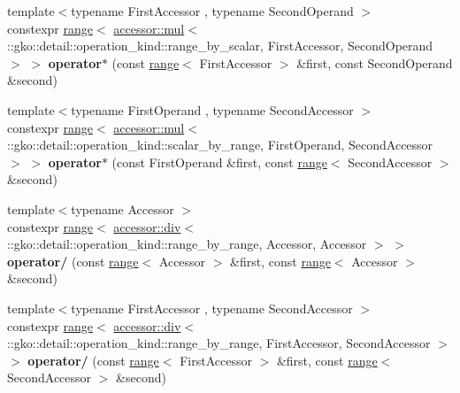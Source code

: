 \begin{DoxyCompactItemize}
\item 
\mbox{\label{namespacegko_a1cb48dd84f149784a1b8827d5cc1a190}} 
{\footnotesize template$<$typename First\+Accessor , typename Second\+Operand $>$ }\\constexpr \hyperlink{classgko_1_1range}{range}$<$ \hyperlink{structgko_1_1accessor_1_1mul}{accessor\+::mul}$<$ \+::gko\+::detail\+::operation\+\_\+kind\+::range\+\_\+by\+\_\+scalar, First\+Accessor, Second\+Operand $>$ $>$ {\bfseries operator$\ast$} (const \hyperlink{classgko_1_1range}{range}$<$ First\+Accessor $>$ \&first, const Second\+Operand \&second)
\item 
\mbox{\label{namespacegko_aa2fb75dc070c4ea51828628aeec144cc}} 
{\footnotesize template$<$typename First\+Operand , typename Second\+Accessor $>$ }\\constexpr \hyperlink{classgko_1_1range}{range}$<$ \hyperlink{structgko_1_1accessor_1_1mul}{accessor\+::mul}$<$ \+::gko\+::detail\+::operation\+\_\+kind\+::scalar\+\_\+by\+\_\+range, First\+Operand, Second\+Accessor $>$ $>$ {\bfseries operator$\ast$} (const First\+Operand \&first, const \hyperlink{classgko_1_1range}{range}$<$ Second\+Accessor $>$ \&second)
\item 
\mbox{\label{namespacegko_a83c291b8175c3a41649bdfdfde9d7485}} 
{\footnotesize template$<$typename Accessor $>$ }\\constexpr \hyperlink{classgko_1_1range}{range}$<$ \hyperlink{structgko_1_1accessor_1_1div}{accessor\+::div}$<$ \+::gko\+::detail\+::operation\+\_\+kind\+::range\+\_\+by\+\_\+range, Accessor, Accessor $>$ $>$ {\bfseries operator/} (const \hyperlink{classgko_1_1range}{range}$<$ Accessor $>$ \&first, const \hyperlink{classgko_1_1range}{range}$<$ Accessor $>$ \&second)
\item 
\mbox{\label{namespacegko_a40c33c78a06d2e2bae92f7f1cc254a3e}} 
{\footnotesize template$<$typename First\+Accessor , typename Second\+Accessor $>$ }\\constexpr \hyperlink{classgko_1_1range}{range}$<$ \hyperlink{structgko_1_1accessor_1_1div}{accessor\+::div}$<$ \+::gko\+::detail\+::operation\+\_\+kind\+::range\+\_\+by\+\_\+range, First\+Accessor, Second\+Accessor $>$ $>$ {\bfseries operator/} (const \hyperlink{classgko_1_1range}{range}$<$ First\+Accessor $>$ \&first, const \hyperlink{classgko_1_1range}{range}$<$ Second\+Accessor $>$ \&second)

\end{DoxyCompactItemize}
